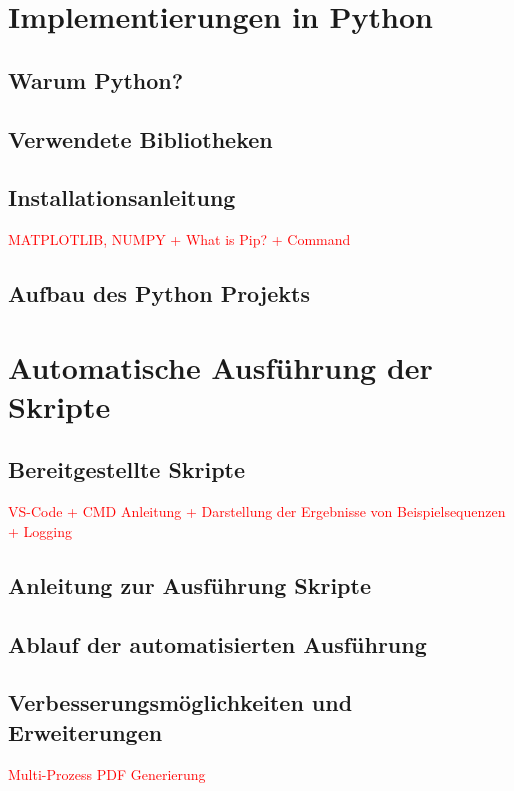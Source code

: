 \chapter{Implementierungen in Python}

\section{Warum Python?}

\section{Verwendete Bibliotheken}

\section{Installationsanleitung}
\textcolor{red}{MATPLOTLIB, NUMPY + What is Pip? + Command}


\section{Aufbau des Python Projekts}






\chapter{Automatische Ausführung der Skripte}

\section{Bereitgestellte Skripte}
\textcolor{red}{VS-Code + CMD Anleitung + Darstellung der Ergebnisse von Beispielsequenzen + Logging}

\section{Anleitung zur Ausführung Skripte}

\section{Ablauf der automatisierten Ausführung}

\section{Verbesserungsmöglichkeiten und Erweiterungen}
\textcolor{red}{Multi-Prozess PDF Generierung}